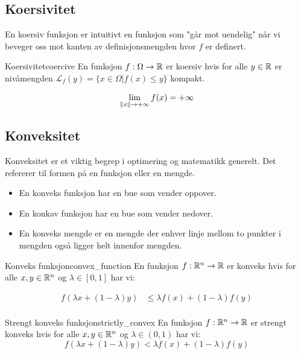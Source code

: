 \subsection{Koersivitet}

En koersiv funksjon er intuitivt en funksjon som "går mot uendelig" når vi beveger oss mot kanten av definisjonsmengden hvor \( f \) er definert.

\begin{definition}{Koersivitet}{coercive}
  En funksjon \(f: \Omega \to \mathbb{R}\) er koersiv hvis for alle \(y \in \mathbb{R}\) er nivåmengden \(\mathcal{L}_f(y) = \{x \in \Omega | f(x) \leq y\}\) kompakt.

  \[
    \lim_{\lVert x\rVert \to +\infty} f(x) = +\infty
  \]
\end{definition}

\subsection{Konveksitet}

Konveksitet er et viktig begrep i optimering og matematikk generelt. Det refererer til formen på en funksjon eller en mengde.
\begin{itemize}
  \item En konveks funksjon har en bue som vender oppover.
  \item En konkav funksjon har en bue som vender nedover.
  \item En konveks mengde er en mengde der enhver linje mellom to punkter i mengden også ligger helt innenfor mengden.
\end{itemize}

\begin{definition}{Konveks funksjon}{convex_function}
  En funksjon \(f: \mathbb{R}^n \to \mathbb{R}\) er konveks hvis for alle \(x, y \in \mathbb{R}^n\) og \(\lambda \in [0, 1]\) har vi:

  \begin{align*}
    f(\lambda x + (1 - \lambda)y) & \leq \lambda f(x) + (1 - \lambda)f(y) \\
  \end{align*}
\end{definition}

\begin{definition}{Strengt konveks funksjon}{strictly_convex}
  En funksjon \(f: \mathbb{R}^n \to \mathbb{R}\) er strengt konveks hvis for alle \(x, y \in \mathbb{R}^n\) og \(\lambda \in (0, 1)\) har vi:
  \[
    f(\lambda x + (1 - \lambda)y) < \lambda f(x) + (1 - \lambda)f(y)
  \]
\end{definition}

